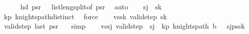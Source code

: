 \begin{isabellebody}
\ \ \ \ \isamarkupfalse%
\ {\isacartoucheopen}hd\ ps\isactrlsub r\ {\isacharequal}{\kern0pt}\ {\isacharparenleft}{\kern0pt}{}{\isacharcomma}{\kern0pt}{}{\isacharparenright}{\kern0pt}{\isacartoucheclose}\ list{\isacharunderscore}{\kern0pt}len{\isacharunderscore}{\kern0pt}g{\isacharunderscore}{\kern0pt}{}{\isacharunderscore}{\kern0pt}split{\isacharbrackleft}{\kern0pt}of\ ps\isactrlsub r{\isacharbrackright}{\kern0pt}\ \isamarkupfalse%
\ auto\isanewline
\ \ \isamarkupfalse%
\ {\isachardoublequoteopen}s\isactrlsub j\ {\isasymnoteq}\ s\isactrlsub k{\isachardoublequoteclose}\isanewline
\ \ \ \ \isamarkupfalse%
\ kp\ knights{\isacharunderscore}{\kern0pt}path{\isacharunderscore}{\kern0pt}distinct\ \isamarkupfalse%
\ force\isanewline
\isanewline
\ \ \isamarkupfalse%
\ vs{\isacharunderscore}{\kern0pt}s\isactrlsub k{\isacharcolon}{\kern0pt}\ {\isachardoublequoteopen}valid{\isacharunderscore}{\kern0pt}step\ s\isactrlsub k\ {\isacharparenleft}{\kern0pt}{}{\isacharcomma}{\kern0pt}{}{\isacharparenright}{\kern0pt}{\isachardoublequoteclose}\isanewline
\ \ \ \ \isamarkupfalse%
\ {\isacartoucheopen}valid{\isacharunderscore}{\kern0pt}step\ {\isacharparenleft}{\kern0pt}last\ ps\isactrlsub r{\isacharparenright}{\kern0pt}\ {\isacharparenleft}{\kern0pt}{}{\isacharcomma}{\kern0pt}{}{\isacharparenright}{\kern0pt}{\isacartoucheclose}\ \isamarkupfalse%
\ simp\isanewline
\isanewline
\ \ \isamarkupfalse%
\ vs{\isacharunderscore}{\kern0pt}s\isactrlsub j{\isacharcolon}{\kern0pt}\ {\isachardoublequoteopen}valid{\isacharunderscore}{\kern0pt}step\ {\isacharparenleft}{\kern0pt}{}{\isacharcomma}{\kern0pt}{}{\isacharparenright}{\kern0pt}\ s\isactrlsub j{\isachardoublequoteclose}\ \ kp{\isacharprime}{\kern0pt}{\isacharcolon}{\kern0pt}\ {\isachardoublequoteopen}knights{\isacharunderscore}{\kern0pt}path\ {\isacharparenleft}{\kern0pt}{\isacharquery}{\kern0pt}b\ {\isacharminus}{\kern0pt}\ {\isacharbraceleft}{\kern0pt}{\isacharparenleft}{\kern0pt}{}{\isacharcomma}{\kern0pt}{}{\isacharparenright}{\kern0pt}{\isacharbraceright}{\kern0pt}{\isacharparenright}{\kern0pt}\ {\isacharparenleft}{\kern0pt}s\isactrlsub j{\isacharhash}{\kern0pt}ps{\isacharprime}{\kern0pt}{\isacharat}{\kern0pt}{\isacharbrackleft}{\kern0pt}s\isactrlsub k{\isacharbrackright}{\kern0pt}{\isacharparenright}{\kern0pt}{\isachardoublequoteclose}\isanewline

\end{isabellebody}
